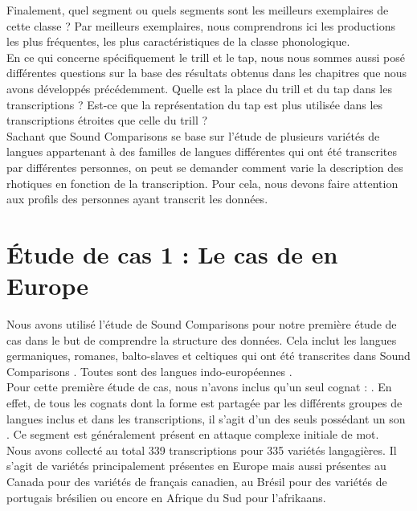 Finalement, quel segment ou quels segments sont les meilleurs exemplaires de cette classe ? 
Par meilleurs exemplaires, nous comprendrons ici les productions les plus fréquentes, les plus caractéristiques de la classe phonologique.\\

En ce qui concerne spécifiquement le trill et le tap, nous nous sommes aussi posé différentes questions sur la base des résultats obtenus dans les chapitres que nous avons développés précédemment. Quelle est la place du trill et du tap dans les transcriptions ? Est-ce que la représentation du tap est plus utilisée dans les transcriptions étroites que celle du trill ?\\

Sachant que Sound Comparisons se base sur l'étude de plusieurs variétés de langues appartenant à des familles de langues différentes qui ont été transcrites par différentes personnes, on peut se demander comment varie la description des rhotiques en fonction de la transcription. Pour cela, nous devons faire attention aux profils des personnes ayant transcrit les données.

\section{Étude de cas 1 : Le cas de  en Europe}

Nous avons utilisé l'étude  \parencite{heggarty_sound_2019-2} de Sound Comparisons pour notre première étude de cas dans le but de comprendre la structure des données.
Cela inclut les langues germaniques, romanes, balto-slaves et celtiques qui ont été transcrites dans Sound Comparisons \parencite{heggartySoundComparisonsNew2019}. Toutes sont des langues indo-européennes . \\

Pour cette première étude de cas, nous n'avons inclus qu'un seul cognat : . En effet, de tous les cognats dont la forme est partagée par les différents groupes de langues inclus et dans les transcriptions, il s'agit d'un des seuls possédant un son . Ce segment est généralement présent en attaque complexe initiale de mot.\\

Nous avons collecté au total 339 transcriptions pour 335 variétés langagières. Il s'agit de variétés principalement présentes en Europe mais aussi présentes au Canada pour des variétés de français canadien, au Brésil pour des variétés de portugais brésilien ou encore en Afrique du Sud pour l'afrikaans.

